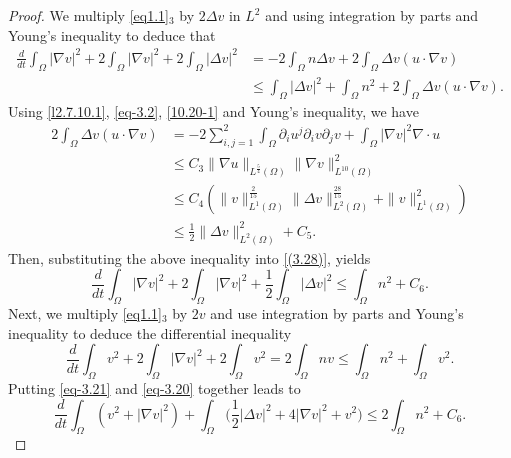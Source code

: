 \documentclass[reqno]{amsart}
\begin{document}
\begin{proof}
We multiply \eqref{eq1.1}$_3$ by $2\Delta v$ in $L^2$ and using integration
 by parts and Young's inequality to deduce that
\begin{equation}\label{(3.28)}
\begin{aligned}
\frac{d}{dt} \int_{\Omega} |\nabla v|^2 
+ 2 \int_{\Omega} |\nabla v|^2 + 2 \int_{\Omega} |\Delta v|^2 
&= - 2 \int_{\Omega} n \Delta v +
2\int_{\Omega} \Delta v (u \cdot \nabla v) \\
&\leq \int_{\Omega} |\Delta v|^2 + \int_{\Omega} n^2 
+ 2\int_{\Omega} \Delta v (u \cdot \nabla v) .
\end{aligned}
\end{equation}
Using \eqref{l2.7.10.1}, \eqref{eq-3.2}, \eqref{10.20-1} and Young's inequality, we have
\begin{equation}\label{eq-3.19}
\begin{aligned}
2\int_{\Omega} \Delta v (u \cdot \nabla v) 
&= -2\sum_{i,j=1}^{2} \int_{\Omega} \partial_i u^j \partial_i v \partial_j v+\int_{\Omega}|\nabla
v|^2\nabla\cdot u\\
&\leq C_3 \|\nabla u\|_{L^{\frac{5}{4}}(\Omega)} \|\nabla v\|_{L^{10}(\Omega)}^2 \\
&\leq C_4\left(\|v\|_{L^1(\Omega)}^{\frac{2}{15}} \|\Delta v\|_{L^2(\Omega)}^{\frac{28}{15}}+\| v\|^2_{L^1(\Omega)}\right) \\
&\leq \frac{1}{2}\|\Delta v\|_{L^2(\Omega)}^2+C_5.
\end{aligned}
\end{equation}
Then, substituting the above inequality into \eqref{(3.28)}, yields
\begin{equation}\label{eq-3.20}
\frac{d}{dt} \int_{\Omega} |\nabla v|^2 + 2 \int_{\Omega} |\nabla v|^2 
+ \frac{1}{2} \int_{\Omega} |\Delta v|^2 \leq \int_{\Omega} n^2+ C_6.
\end{equation}
Next, we multiply \eqref{eq1.1}$_3$ by $2v$ and use integration by parts and 
Young's inequality to deduce the differential inequality
\begin{equation}\label{eq-3.21}
\frac{d}{dt} \int_{\Omega} v^2 + 2\int_{\Omega} |\nabla v|^2
 + 2\int_{\Omega} v^2 = 2\int_{\Omega} nv \leq \int_{\Omega} n^2 + \int_{\Omega} v^2.
\end{equation}
Putting \eqref{eq-3.21} and \eqref{eq-3.20} together leads to
\begin{equation}\label{eq-3.22}
\frac{d}{dt} \int_{\Omega} ( v^2 + |\nabla v|^2 ) 
+ \int_{\Omega}\Big(\frac{1}{2} |\Delta v|^2+4|\nabla v|^2+ v^2\Big) 
\leq 2\int_{\Omega} n^2+ C_6.
\end{equation}


\end{proof}
\end{document}
